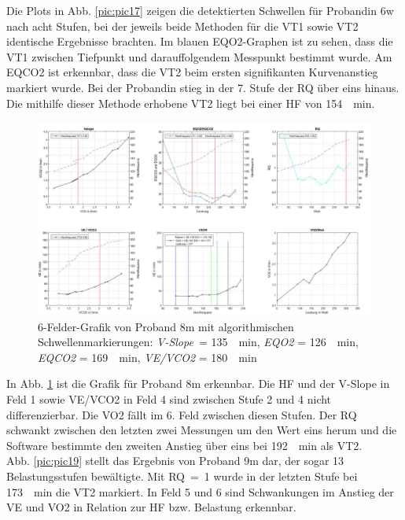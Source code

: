 %
Die Plots in Abb. \ref{pic:pic17} zeigen die detektierten Schwellen für Probandin 6w nach acht Stufen, bei der jeweils beide Methoden für die VT1 sowie VT2 identische Ergebnisse brachten. Im blauen \gls{EQO2}-Graphen ist zu sehen, dass die VT1 zwischen Tiefpunkt und darauffolgendem Messpunkt bestimmt wurde. Am \gls{EQCO2} ist erkennbar, dass die VT2 beim ersten signifikanten Kurvenanstieg markiert wurde. Bei der Probandin stieg in der 7. Stufe der RQ über eins hinaus. Die mithilfe dieser Methode erhobene VT2 liegt bei einer \gls{HF} von \SI{154}{\per\minute}.
%
\begin{figure}[H]
	\centering
	\noindent\includegraphics[angle=0,width=\linewidth,keepaspectratio]{Bilder/auto_8}
	\caption[6-Felder-Grafik von Proband 8m mit algorithmischen Schwellenmarkierungen]{6-Felder-Grafik von Proband 8m mit algorithmischen Schwellenmarkierungen: \textsl{V-Slope}~= \SI{135}{\per\minute}, \textsl{\gls{EQO2}} = \SI{126}{\per\minute}, \textsl{\gls{EQCO2}} = \SI{169}{\per\minute}, \textsl{\gls{VE}/\gls{VCO2}} = \SI{180}{\per\minute}}
	\label{pic:pic18}
\end{figure}
%
In Abb. \ref{pic:pic18} ist die Grafik für Proband 8m erkennbar. Die \gls{HF} und der V-Slope in Feld 1 sowie \gls{VE}/\gls{VCO2} in Feld 4 sind zwischen Stufe 2 und 4 nicht differenzierbar. Die \gls{VO2} fällt im 6. Feld zwischen diesen Stufen. Der RQ schwankt zwischen den letzten zwei Messungen um den Wert eins herum und die Software bestimmte den zweiten Anstieg über eins bei \SI{192}{\per\minute} als VT2.\\
Abb. \ref{pic:pic19} stellt das Ergebnis von Proband 9m dar, der sogar 13 Belastungsstufen bewältigte. Mit RQ~=~1 wurde in der letzten Stufe bei \SI{173}{\per\minute} die VT2 markiert. In Feld 5 und 6 sind Schwankungen im Anstieg der \gls{VE} und \gls{VO2} in Relation zur \gls{HF} bzw. Belastung erkennbar.
